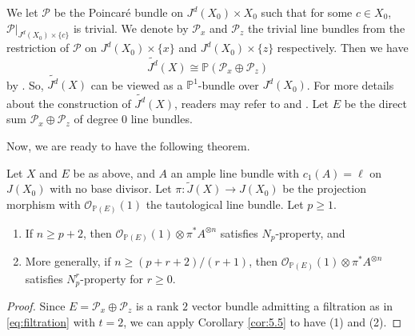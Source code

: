 \documentclass[11pt,letter]{amsart}
\numberwithin{equation}{section}
\begin{document}
We let $\mathcal{P}$ be the Poincar\'{e} bundle on $J^d(X_0)\times X_0$ such that for some $c\in X_0$,
$\mathcal{P}|_{J^d(X_0)\times\{c\}}$ is trivial. We denote by $\mathcal{P}_{x}$ and $\mathcal{P}_{z}$ the trivial line bundles from the restriction of $\mathcal{P}$ on $J^d(X_0)\times\{x\}$ and $J^d(X_0)\times\{z\}$ respectively. Then we have
\[
\widetilde{J^d}(X)\cong\mathbb{P}(\mathcal{P}_x\oplus\mathcal{P}_z)
\]
by \cite[Proposition 2.1]{BP08}. So, $\widetilde{J^d}(X)$ can be viewed as a $\mathbb{P}^1$-bundle over $J^d(X_0)$. For more details about the construction of $\widetilde{J^d}(X)$, readers may refer to \cite{BP08} and \cite[Proposition 12.1]{OS79}.
Let $E$ be the direct sum $\mathcal{P}_x\oplus\mathcal{P}_z$ of degree $0$ line bundles. 

%

Now, we are ready to have the following theorem. 
\begin{thm}
Let $X$ and $E$ be as above, and $A$ an ample line bundle with ${c}_1(A)=\ell$ on $J(X_0)$ with no base divisor. Let $\pi:\widetilde{J}(X)\rightarrow J(X_0)$ be the projection morphism with $\mathcal{O}_{\mathbb{P}(E)}(1)$ the tautological line bundle.  Let $p\geq 1$.

\begin{enumerate}
\item If $n\geq p+2$, then $\mathcal{O}_{\mathbb{P}(E)}(1)\otimes\pi^*A^{\otimes n}$ satisfies $N_p$-property, and
\item More generally, if $n\geq (p+r+2)/(r+1)$, then $\mathcal{O}_{\mathbb{P}(E)}(1)\otimes\pi^*A^{\otimes n}$ satisfies $N_p^r$-property for $r\geq 0$. \end{enumerate}
\end{thm}
\begin{proof}
Since $E=\mathcal{P}_x\oplus\mathcal{P}_z$ is a rank $2$ vector bundle admitting a filtration as in \eqref{eq:filtration} with $t=2$, we can apply Corollary \ref{cor:5.5} to have (1) and (2).
\end{proof}
\end{document}
